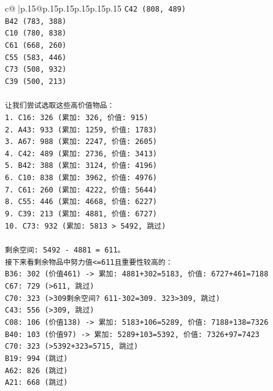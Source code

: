 \documentclass{article}
\begin{document}
{\begin{supertabular}{c@{$\;$}|p{.15\linewidth}@{}p{.15\linewidth}p{.15\linewidth}p{.15\linewidth}p{.15\linewidth}p{.15\linewidth}}
{{{\texttt{C42 (808, 489)} \\
\texttt{B42 (783, 388)} \\
\texttt{C10 (780, 838)} \\
\texttt{C61 (668, 260)} \\
\texttt{C55 (583, 446)} \\
\texttt{C73 (508, 932)} \\
\texttt{C39 (500, 213)} \\
\\ 
\texttt{让我们尝试选取这些高价值物品：} \\
\texttt{1. C16: 326 (累加: 326, 价值: 915)} \\
\texttt{2. A43: 933 (累加: 1259, 价值: 1783)} \\
\texttt{3. A67: 988 (累加: 2247, 价值: 2605)} \\
\texttt{4. C42: 489 (累加: 2736, 价值: 3413)} \\
\texttt{5. B42: 388 (累加: 3124, 价值: 4196)} \\
\texttt{6. C10: 838 (累加: 3962, 价值: 4976)} \\
\texttt{7. C61: 260 (累加: 4222, 价值: 5644)} \\
\texttt{8. C55: 446 (累加: 4668, 价值: 6227)} \\
\texttt{9. C39: 213 (累加: 4881, 价值: 6727)} \\
\texttt{10. C73: 932 (累加: 5813 > 5492, 跳过)} \\
\\ 
\texttt{剩余空间: 5492 {-} 4881 = 611。} \\
\texttt{接下来看剩余物品中努力值<=611且重要性较高的：} \\
\texttt{B36: 302 (价值461) {-}> 累加: 4881+302=5183, 价值: 6727+461=7188} \\
\texttt{C67: 729 (>611, 跳过)} \\
\texttt{C70: 323 (>309剩余空间? 611{-}302=309. 323>309, 跳过)} \\
\texttt{C43: 556 (>309, 跳过)} \\
\texttt{C08: 106 (价值138) {-}> 累加: 5183+106=5289, 价值: 7188+138=7326} \\
\texttt{B40: 103 (价值97) {-}> 累加: 5289+103=5392, 价值: 7326+97=7423} \\
\texttt{C70: 323 (>5392+323=5715, 跳过)} \\
\texttt{B19: 994 (跳过)} \\
\texttt{A62: 826 (跳过)} \\
\texttt{A21: 668 (跳过)} \\
}}}
\end{supertabular}}
\end{document}
